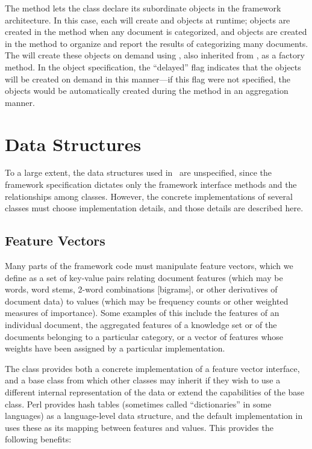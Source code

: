 The  method lets the  class
declare its subordinate objects in the framework architecture.  In
this case, each  will create  and
 objects at runtime;  objects are
created in the  method when any document is
categorized, and  objects are created in the
 method to organize and report the
results of categorizing many documents.  The  will
create these objects on demand using ,
also inherited from , as a factory method.  In
the object specification, the ``delayed'' flag indicates that the
objects will be created on demand in this manner---if this flag were
not specified, the objects would be automatically created during the
 method in an aggregation\cite[p. 22]{gamma:95}
manner.


\section{Data Structures}

To a large extent, the data structures used in \aicat\ are
unspecified, since the framework specification dictates only the
framework interface methods and the relationships among classes.
However, the concrete implementations of several classes must choose
implementation details, and those details are described here.

\subsection{Feature Vectors}
\label{imp-featurevectors}

Many parts of the framework code must manipulate feature vectors,
which we define as a set of key-value pairs relating document features
(which may be words, word stems, 2-word combinations [bigrams], or
other derivatives of document data) to values (which may be frequency
counts or other weighted measures of importance).  Some examples of
this include the features of an individual document, the aggregated
features of a knowledge set or of the documents belonging to a
particular category, or a vector of features whose weights have been
assigned by a particular  implementation.

The  class provides both a concrete
implementation of a feature vector interface, and a base class from
which other classes may inherit if they wish to use a different
internal representation of the data or extend the capabilities of the
base class.  Perl provides hash tables (sometimes called
``dictionaries'' in some languages) as a language-level data
structure, and the default implementation in 
uses these as its mapping between features and values.  This provides
the following benefits:

